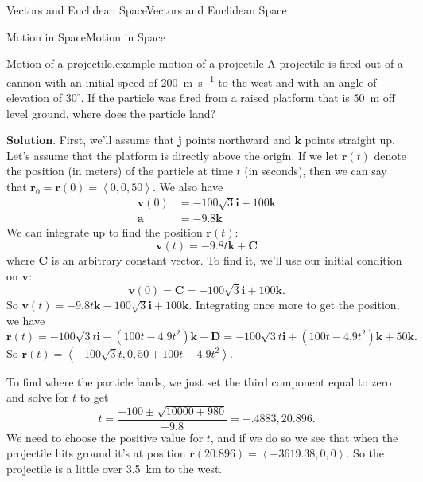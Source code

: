\documentclass[10pt,]{book}
\numberwithin{equation}{section}
\newcommand{\vv}[1]{\mathbf{#1}}
\newcommand{\dotprod}[1]{\left\langle #1 \right\rangle}
\begin{document}
\begin{chapterptx}{Vectors and Euclidean Space}{}{Vectors and Euclidean Space}{}{}
\begin{sectionptx}{Motion in Space}{}{Motion in Space}{}{}
\begin{example}{Motion of a projectile.}{example-motion-of-a-projectile}
\hypertarget{p-1092}{}%
A projectile is fired out of a cannon with an initial speed of \SI{200}{\meter\per\second} to the west and with an angle of elevation of \(30^{\circ}\). If the particle was fired from a raised platform that is \SI{50}{\meter} off level ground, where does the particle land?%
\par\smallskip%
\noindent\textbf{Solution}.\hypertarget{solution-167}{}\quad%
\hypertarget{p-1093}{}%
First, we'll assume that \(\vv{j}\) points northward and \(\vv{k}\) points straight up. Let's assume that the platform is directly above the origin. If we let \(\vv{r}(t)\) denote the position (in meters) of the particle at time \(t\) (in seconds), then we can say that \(\vv{r}_{0} = \vv{r}(0) = \dotprod{0,0,50}\). We also have%
%
\begin{align*}
\vv{v}(0) & = -100\sqrt{3}\vv{i} + 100\vv{k} \\
\vv{a} & = -9.8\vv{k} 
\end{align*}
\hypertarget{p-1094}{}%
We can integrate up to find the position \(\vv{r}(t)\):%
%
\begin{equation*}
\vv{v}(t) = -9.8t\vv{k}+\vv{C}
\end{equation*}
\hypertarget{p-1095}{}%
where \(\vv{C}\) is an arbitrary constant vector. To find it, we'll use our initial condition on \(\vv{v}\):%
%
\begin{equation*}
\vv{v}(0) = \vv{C} = -100\sqrt{3}\vv{i}+100\vv{k}.
\end{equation*}
\hypertarget{p-1096}{}%
So \(\vv{v}(t) = -9.8t\vv{k}-100\sqrt{3}\vv{i}+100\vv{k}\). Integrating once more to get the position, we have%
%
\begin{equation*}
\vv{r}(t) = -100\sqrt{3}t\vv{i}+(100t-4.9t^{2})\vv{k} + \vv{D} = -100\sqrt{3}t\vv{i} + (100t-4.9t^{2})\vv{k} + 50\vv{k}\text{.}
\end{equation*}
\hypertarget{p-1097}{}%
So \(\vv{r}(t) = \dotprod{-100\sqrt{3}t, 0, 50 + 100t - 4.9t^{2}}\).%
\par
\hypertarget{p-1098}{}%
To find where the particle lands, we just set the third component equal to zero and solve for \(t\) to get%
%
\begin{equation*}
t = \frac{-100\pm\sqrt{10000+980}}{-9.8} = -.4883,20.896.
\end{equation*}
\hypertarget{p-1099}{}%
We need to choose the positive value for \(t\), and if we do so we see that when the projectile hits ground it's at position \(\vv{r}(20.896) = \dotprod{-3619.38,0,0}.\) So the projectile is a little over \SI{3.5}{\kilo\meter} to the west.%

\end{example}
\end{sectionptx}
\end{chapterptx}
\end{document}
